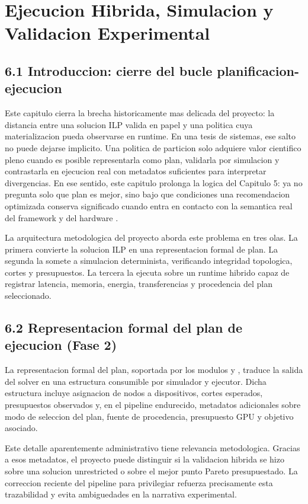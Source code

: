 \chapter{Ejecucion Hibrida, Simulacion y Validacion Experimental}

\section{6.1 Introduccion: cierre del bucle planificacion-ejecucion}
Este capitulo cierra la brecha historicamente mas delicada del proyecto: la distancia entre una solucion ILP valida en papel y una politica cuya materializacion pueda observarse en runtime. En una tesis de sistemas, ese salto no puede dejarse implicito. Una politica de particion solo adquiere valor cientifico pleno cuando es posible representarla como plan, validarla por simulacion y contrastarla en ejecucion real con metadatos suficientes para interpretar divergencias. En ese sentido, este capitulo prolonga la logica del Capitulo 5: ya no pregunta solo que plan es mejor, sino bajo que condiciones una recomendacion optimizada conserva significado cuando entra en contacto con la semantica real del framework y del hardware \cite{paszke2019pytorch,huang2019gpipe,narayanan2019pipedream}.

La arquitectura metodologica del proyecto aborda este problema en tres olas. La primera convierte la solucion ILP en una representacion formal de plan. La segunda la somete a simulacion determinista, verificando integridad topologica, cortes y presupuestos. La tercera la ejecuta sobre un runtime hibrido capaz de registrar latencia, memoria, energia, transferencias y procedencia del plan seleccionado.

\section{6.2 Representacion formal del plan de ejecucion (Fase 2)}
La representacion formal del plan, soportada por los modulos  y , traduce la salida del solver en una estructura consumible por simulador y ejecutor. Dicha estructura incluye asignacion de nodos a dispositivos, cortes esperados, presupuestos observados y, en el pipeline endurecido, metadatos adicionales sobre modo de seleccion del plan, fuente de procedencia, presupuesto GPU y objetivo asociado.

Este detalle aparentemente administrativo tiene relevancia metodologica. Gracias a esos metadatos, el proyecto puede distinguir si la validacion hibrida se hizo sobre una solucion unrestricted o sobre el mejor punto Pareto presupuestado. La correccion reciente del pipeline para privilegiar  refuerza precisamente esta trazabilidad y evita ambiguedades en la narrativa experimental.

